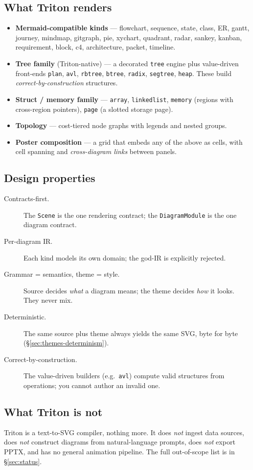 \subsection{What Triton renders}

\begin{itemize}
  \item \textbf{Mermaid-compatible kinds} --- flowchart, sequence, state, class,
        ER, gantt, journey, mindmap, gitgraph, pie, xychart, quadrant, radar,
        sankey, kanban, requirement, block, c4, architecture, packet, timeline.
  \item \textbf{Tree family} (Triton-native) --- a decorated \texttt{tree}
        engine plus value-driven front-ends \texttt{plan}, \texttt{avl},
        \texttt{rbtree}, \texttt{btree}, \texttt{radix}, \texttt{segtree},
        \texttt{heap}. These build \emph{correct-by-construction} structures.
  \item \textbf{Struct / memory family} --- \texttt{array}, \texttt{linkedlist},
        \texttt{memory} (regions with cross-region pointers), \texttt{page}
        (a slotted storage page).
  \item \textbf{Topology} --- cost-tiered node graphs with legends and nested
        groups.
  \item \textbf{Poster composition} --- a grid that embeds any of the above as
        cells, with cell spanning and \emph{cross-diagram links} between panels.
\end{itemize}

\subsection{Design properties}

\begin{description}
  \item[Contracts-first.] The \texttt{Scene} is the one rendering contract; the
        \texttt{DiagramModule} is the one diagram contract.
  \item[Per-diagram IR.] Each kind models its own domain; the god-IR is
        explicitly rejected.
  \item[Grammar = semantics, theme = style.] Source decides \emph{what} a
        diagram means; the theme decides \emph{how} it looks. They never mix.
  \item[Deterministic.] The same source plus theme always yields the same SVG,
        byte for byte (\S\ref{sec:themes-determinism}).
  \item[Correct-by-construction.] The value-driven builders (e.g.\ \texttt{avl})
        compute valid structures from operations; you cannot author an invalid
        one.
\end{description}

\subsection{What Triton is not}

Triton is a text-to-SVG compiler, nothing more. It does \emph{not} ingest data
sources, does \emph{not} construct diagrams from natural-language prompts, does
\emph{not} export PPTX, and has no general animation pipeline. The full
out-of-scope list is in \S\ref{sec:status}.
